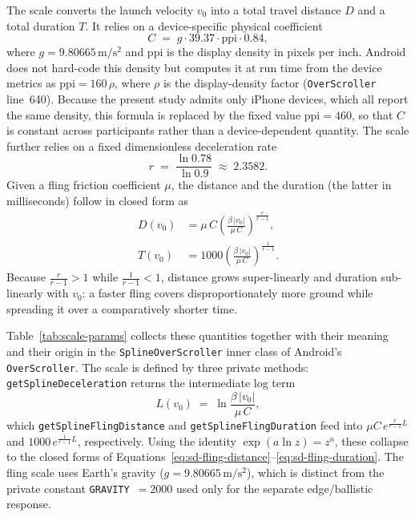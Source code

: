 \documentclass[12pt,a4paper]{report}
\begin{document}
        The scale converts the launch velocity $v_0$ into a total travel distance $D$ and a total duration $T$. It relies on a device-specific physical coefficient
        \begin{equation}
        C \;=\; g \cdot 39.37 \cdot \mathrm{ppi} \cdot 0.84,
        \label{eq:sd-physical-coeff}
        \end{equation}
        where $g=9.80665\,\mathrm{m/s^2}$ and $\mathrm{ppi}$ is the display density in pixels per inch. Android does not hard-code this density but computes it at run time from the device metrics as $\mathrm{ppi}=160\,\rho$, where $\rho$ is the display-density factor (\texttt{OverScroller} line~640). Because the present study admits only iPhone devices, which all report the same density, this formula is replaced by the fixed value $\mathrm{ppi}=460$, so that $C$ is constant across participants rather than a device-dependent quantity. The scale further relies on a fixed dimensionless deceleration rate
        \begin{equation}
        r \;=\; \frac{\ln 0.78}{\ln 0.9} \;\approx\; 2.3582 .
        \label{eq:sd-decel-rate}
        \end{equation}
        Given a fling friction coefficient $\mu$, the distance and the duration (the latter in milliseconds) follow in closed form as
        \begin{align}
        D(v_0) &= \mu\,C \left( \frac{\beta\,\lvert v_0 \rvert}{\mu\,C} \right)^{\!\frac{r}{r-1}}, \label{eq:sd-fling-distance}\\[2pt]
        T(v_0) &= 1000 \left( \frac{\beta\,\lvert v_0 \rvert}{\mu\,C} \right)^{\!\frac{1}{r-1}}. \label{eq:sd-fling-duration}
        \end{align}
        Because $\tfrac{r}{r-1} > 1$ while $\tfrac{1}{r-1} < 1$, distance grows super-linearly and duration sub-linearly with $v_0$: a faster fling covers disproportionately more ground while spreading it over a comparatively shorter time.

        Table~\ref{tab:scale-params} collects these quantities together with their meaning and their origin in the \texttt{SplineOverScroller} inner class of Android's \texttt{OverScroller}. The scale is defined by three private methods: \texttt{getSplineDeceleration} returns the intermediate log term
        \begin{equation}
        L(v_0) \;=\; \ln\!\frac{\beta\,\lvert v_0\rvert}{\mu\,C},
        \label{eq:sd-spline-decel}
        \end{equation}
        which \texttt{getSplineFlingDistance} and \texttt{getSplineFlingDuration} feed into $\mu C\,e^{\frac{r}{r-1}L}$ and $1000\,e^{\frac{1}{r-1}L}$, respectively. Using the identity $\exp(a\ln z)=z^{a}$, these collapse to the closed forms of Equations~\eqref{eq:sd-fling-distance}--\eqref{eq:sd-fling-duration}. The fling scale uses Earth's gravity ($g=9.80665\,\mathrm{m/s^2}$), which is distinct from the private constant \texttt{GRAVITY}~$=2000$ used only for the separate edge/ballistic response.
\end{document}
